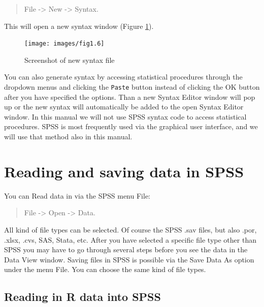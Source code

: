 \documentclass[
]{book}
\begin{document}
\begin{quote}
File -\textgreater{} New -\textgreater{} Syntax.
\end{quote}

This will open a new syntax window (Figure \ref{fig:fig6}).

\begin{figure}

{\centering \texttt{[image: images/fig1.6]} 

}

\caption{Screenshot of new syntax file}\label{fig:fig6}
\end{figure}

You can also generate syntax by accessing statistical procedures through the dropdown menus and clicking the \texttt{Paste} button instead of clicking the OK button after you have specified the options. Than a new Syntax Editor window will pop up or the new syntax will automatically be added to the open Syntax Editor window. In this manual we will not use SPSS syntax code to access statistical procedures. SPSS is most frequently used via the graphical user interface, and we will use that method also in this manual.

\hypertarget{reading-and-saving-data-in-spss}{%
\section{Reading and saving data in SPSS}\label{reading-and-saving-data-in-spss}}

You can Read data in via the SPSS menu File:

\begin{quote}
File -\textgreater{} Open -\textgreater{} Data.
\end{quote}

All kind of file types can be selected. Of course the SPSS .sav files, but also .por, .xlsx, .cvs, SAS, Stata, etc. After you have selected a specific file type other than SPSS you may have to go through several steps before you see the data in the Data View window. Saving files in SPSS is possible via the Save Data As option under the menu File. You can choose the same kind of file types.

\hypertarget{reading-in-r-data-into-spss}{%
\subsection{Reading in R data into SPSS}\label{reading-in-r-data-into-spss}}
\end{document}
